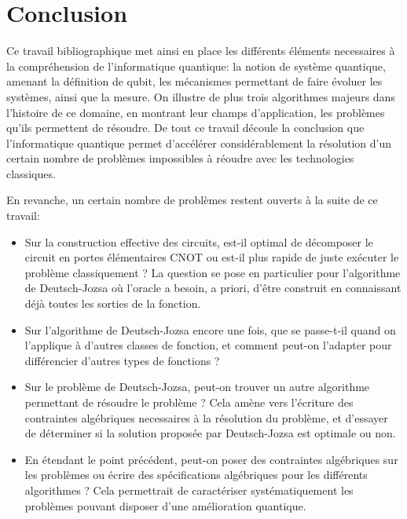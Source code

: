 \chapter{Conclusion}

Ce travail bibliographique met ainsi en place les différents éléments necessaires à la compréhension de l'informatique quantique: la notion de système quantique, amenant la définition de qubit, les mécanismes permettant de faire évoluer les systèmes, ainsi que la mesure. On illustre de plus trois algorithmes majeurs dans l'histoire de ce domaine, en montrant leur champs d'application, les problèmes qu'ils permettent de résoudre. De tout ce travail découle la conclusion que l'informatique quantique permet d'accélérer considérablement la résolution d'un certain nombre de problèmes impossibles à réoudre avec les technologies classiques.

En revanche, un certain nombre de problèmes restent ouverts à la suite de ce travail:

\begin{itemize}
    \item Sur la construction effective des circuits, est-il optimal de décomposer le circuit en portes élémentaires CNOT ou est-il plus rapide de juste exécuter le problème classiquement ? La question se pose en particulier pour l'algorithme de Deutsch-Jozsa où l'oracle a besoin, a priori, d'être construit en connaissant déjà toutes les sorties de la fonction.
    \item Sur l'algorithme de Deutsch-Jozsa encore une fois, que se passe-t-il quand on l'applique à d'autres classes de fonction, et comment peut-on l'adapter pour différencier d'autres types de fonctions ?
    \item Sur le problème de Deutsch-Jozsa, peut-on trouver un autre algorithme permettant de résoudre le problème ? Cela amène vers l'écriture des contraintes algébriques necessaires à la résolution du problème, et d'essayer de déterminer si la solution proposée par Deutsch-Jozsa est optimale ou non.
    \item En étendant le point précédent, peut-on poser des contraintes algébriques sur les problèmes ou écrire des spécifications algébriques pour les différents algorithmes ? Cela permettrait de caractériser systématiquement les problèmes pouvant disposer d'une amélioration quantique.
\end{itemize}